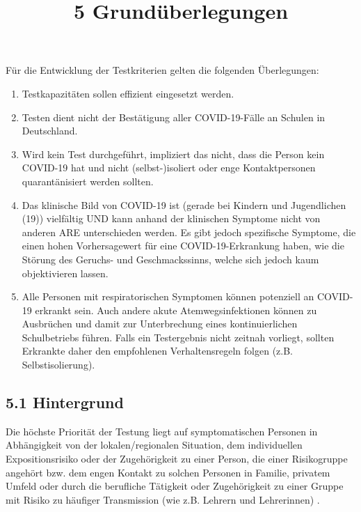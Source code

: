 \documentclass{article}
\begin{document}
\title{5 Grundüberlegungen}

\maketitle


Für die Entwicklung der Testkriterien gelten die folgenden Überlegungen: 

\begin{enumerate}
\item Testkapazitäten sollen effizient eingesetzt werden. 


\item Testen dient nicht der Bestätigung aller COVID-19-Fälle an Schulen in Deutschland. 


\item Wird kein Test durchgeführt, impliziert das nicht, dass die Person kein COVID-19 hat und nicht (selbst-)isoliert oder enge Kontaktpersonen quarantänisiert werden sollten. 


\item Das klinische Bild von COVID-19 ist (gerade bei Kindern und Jugendlichen (19)) vielfältig UND kann anhand der klinischen Symptome nicht von anderen ARE unterschieden werden. Es gibt jedoch spezifische Symptome, die einen hohen Vorhersagewert für eine COVID-19-Erkrankung haben, wie die Störung des Geruchs- und Geschmackssinns, welche sich jedoch kaum objektivieren lassen. 


\item Alle Personen mit respiratorischen Symptomen können potenziell an COVID-19 erkrankt sein. Auch andere akute Atemwegsinfektionen können zu Ausbrüchen und damit zur Unterbrechung eines kontinuierlichen Schulbetriebs führen. Falls ein Testergebnis nicht zeitnah vorliegt, sollten Erkrankte daher den empfohlenen Verhaltensregeln folgen (z.B. Selbstisolierung).


\end{enumerate}

\subsection{5.1 Hintergrund }\label{H5129027}



Die höchste Priorität der Testung liegt auf symptomatischen Personen in Abhängigkeit von der lokalen/regionalen Situation, dem individuellen Expositionsrisiko oder der Zugehörigkeit zu einer Person, die einer Risikogruppe angehört bzw. dem engen Kontakt zu solchen Personen in Familie, privatem Umfeld oder durch die berufliche Tätigkeit oder Zugehörigkeit zu einer Gruppe mit Risiko zu häufiger Transmission (wie z.B. Lehrern und Lehrerinnen) . 
\end{document}
